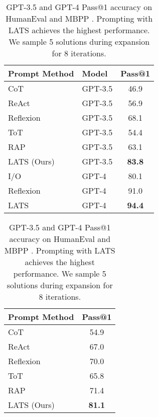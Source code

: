 \documentclass{article} \usepackage{iclr2024_conference,times}
\begin{document}
\begin{table}[t]
\begin{minipage}{.48\linewidth}  \centering
    \begin{tabular}{ll | c}
    \toprule
    \textbf{Prompt Method} & \textbf{Model} & \textbf{Pass@1} \\
    \midrule
    CoT {\scriptsize~\citep{wei2022chain}} & GPT-3.5 & 46.9 \\
    ReAct {\scriptsize~\citep{yao2023react}} & GPT-3.5 & 56.9 \\
    Reflexion {\scriptsize~\citep{shinn2023reflexion}} & GPT-3.5 & 68.1 \\
    ToT {\scriptsize~\citep{yao2023tree}} & GPT-3.5 & 54.4 \\
    RAP {\scriptsize~\citep{hao2023reasoning}} & GPT-3.5 & 63.1 \\
    LATS (Ours) & GPT-3.5 & \textbf{83.8} \\ 
    \midrule
    I/O & GPT-4 & 80.1 \\
    Reflexion & GPT-4 & 91.0 \\
    LATS & GPT-4 & \textbf{94.4} \\
    \bottomrule
    \end{tabular}
\end{minipage}\hfill  \begin{minipage}{.48\linewidth}  \centering
    \vspace{-0.53in}
    \begin{tabular}{l | c}
    \toprule
    \textbf{Prompt Method} & \textbf{Pass@1} \\
    \midrule
    CoT {\scriptsize~\citep{wei2022chain}} & 54.9 \\
    ReAct {\scriptsize~\citep{wei2022chain}} & 67.0 \\
    Reflexion {\scriptsize~\citep{shinn2023reflexion}} & 70.0 \\
    ToT {\scriptsize~\citep{yao2023tree}} & 65.8 \\
    RAP {\scriptsize~\citep{hao2023reasoning}} & 71.4 \\
    LATS (Ours) & \textbf{81.1} \\
    \bottomrule
    \end{tabular}
\end{minipage}
\caption{GPT-3.5 and GPT-4 Pass@1 accuracy on HumanEval \citep{chen2021evaluating} and MBPP \citep{austin2021program}. Prompting with LATS achieves the highest performance. We sample 5 solutions during expansion for {\color{red}8} iterations.}
\label{table:programming}
\vspace{-0.15in}
\end{table}
 
\end{document}
